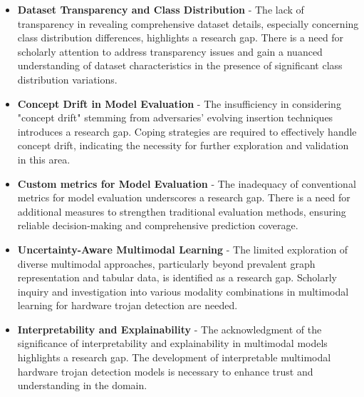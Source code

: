 \begin{itemize}

    \item \textbf{Dataset Transparency and Class Distribution} - The lack of transparency in revealing comprehensive dataset details, especially concerning class distribution differences, highlights a research gap. There is a need for scholarly attention to address transparency issues and gain a nuanced understanding of dataset characteristics in the presence of significant class distribution variations.
    
    \item \textbf{Concept Drift in Model Evaluation} - The insufficiency in considering "concept drift" stemming from adversaries' evolving insertion techniques introduces a research gap. Coping strategies are required to effectively handle concept drift, indicating the necessity for further exploration and validation in this area.
    
    \item \textbf{Custom metrics for Model Evaluation} - The inadequacy of conventional metrics for model evaluation underscores a research gap. There is a need for additional measures to strengthen traditional evaluation methods, ensuring reliable decision-making and comprehensive prediction coverage.
    
    
    \item \textbf{Uncertainty-Aware Multimodal Learning} - The limited exploration of diverse multimodal approaches, particularly beyond prevalent graph representation and tabular data, is identified as a research gap. Scholarly inquiry and investigation into various modality combinations in multimodal learning for hardware trojan detection are needed.
    

    
    \item \textbf{Interpretability and Explainability} - The acknowledgment of the significance of interpretability and explainability in multimodal models highlights a research gap. The development of interpretable multimodal hardware trojan detection models is necessary to enhance trust and understanding in the domain.

\end{itemize}


